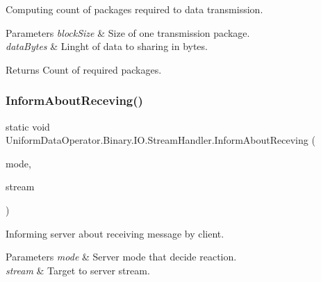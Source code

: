 Computing count of packages required to data transmission. 


\begin{DoxyParams}{Parameters}
{\em block\+Size} & Size of one transmission package.\\
\hline
{\em data\+Bytes} & Linght of data to sharing in bytes.\\
\hline
\end{DoxyParams}
\begin{DoxyReturn}{Returns}
Count of required packages.
\end{DoxyReturn}
\mbox{\label{class_uniform_data_operator_1_1_binary_1_1_i_o_1_1_stream_handler_a3732dec20d216595f8148e91b7aac76a}} 
\subsubsection{\texorpdfstring{Inform\+About\+Receving()}{InformAboutReceving()}}
{\footnotesize\ttfamily static void Uniform\+Data\+Operator.\+Binary.\+I\+O.\+Stream\+Handler.\+Inform\+About\+Receving (\begin{DoxyParamCaption}\item[{\mbox{\hyperlink{namespace_uniform_data_operator_1_1_binary_1_1_i_o_a3fee9a9bcba25974554ed63395942161}{Stream\+Chanel\+Mode}}}]{mode,  }\item[{Stream}]{stream }\end{DoxyParamCaption})\hspace{0.3cm}{\ttfamily [static]}}



Informing server about receiving message by client. 


\begin{DoxyParams}{Parameters}
{\em mode} & Server mode that decide reaction.\\
\hline
{\em stream} & Target to server stream.\\
\hline
\end{DoxyParams}
\mbox{\label{class_uniform_data_operator_1_1_binary_1_1_i_o_1_1_stream_handler_a8953608e9eefaff797f3e4ed49f85bcf}} 
